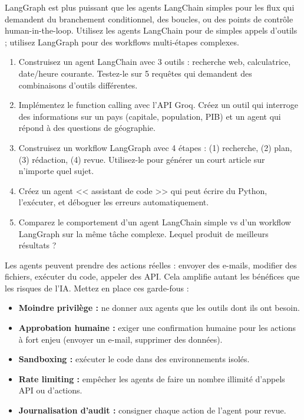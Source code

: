 \begin{aitip}
LangGraph est plus puissant que les agents LangChain simples pour les flux qui demandent du branchement conditionnel, des boucles, ou des points de contr\^ole human-in-the-loop. Utilisez les agents LangChain pour de simples appels d'outils ; utilisez LangGraph pour des workflows multi-\'etapes complexes.
\end{aitip}

\begin{exercise}
\begin{enumerate}
  \item Construisez un agent LangChain avec 3 outils : recherche web, calculatrice, date/heure courante. Testez-le sur 5 requ\^etes qui demandent des combinaisons d'outils diff\'erentes.
  \item Impl\'ementez le function calling avec l'API Groq. Cr\'eez un outil qui interroge des informations sur un pays (capitale, population, PIB) et un agent qui r\'epond \`a des questions de g\'eographie.
  \item Construisez un workflow LangGraph avec 4 \'etapes : (1) recherche, (2) plan, (3) r\'edaction, (4) revue. Utilisez-le pour g\'en\'erer un court article sur n'importe quel sujet.
  \item Cr\'eez un agent << assistant de code >> qui peut \'ecrire du Python, l'ex\'ecuter, et d\'eboguer les erreurs automatiquement.
  \item Comparez le comportement d'un agent LangChain simple vs d'un workflow LangGraph sur la m\^eme t\^ache complexe. Lequel produit de meilleurs r\'esultats ?
\end{enumerate}
\end{exercise}

\begin{ethicsbox}
Les agents peuvent prendre des actions r\'eelles : envoyer des e-mails, modifier des fichiers, ex\'ecuter du code, appeler des API. Cela amplifie autant les b\'en\'efices que les risques de l'IA. Mettez en place ces garde-fous :
\begin{itemize}
  \item \textbf{Moindre privil\`ege :} ne donner aux agents que les outils dont ils ont besoin.
  \item \textbf{Approbation humaine :} exiger une confirmation humaine pour les actions \`a fort enjeu (envoyer un e-mail, supprimer des donn\'ees).
  \item \textbf{Sandboxing :} ex\'ecuter le code dans des environnements isol\'es.
  \item \textbf{Rate limiting :} emp\^echer les agents de faire un nombre illimit\'e d'appels API ou d'actions.
  \item \textbf{Journalisation d'audit :} consigner chaque action de l'agent pour revue.
\end{itemize}
\end{ethicsbox}

